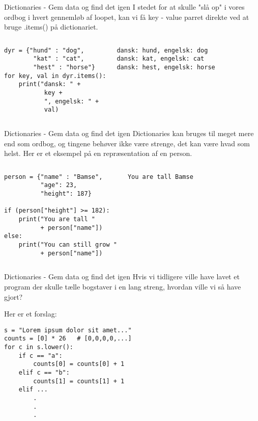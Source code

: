 \documentclass[main.tex]{subfiles}
\begin{document}
\begin{frame}[fragile]{Dictionaries - Gem data og find det igen}
	I stedet for at skulle "slå op" i vores ordbog i hvert gennemløb af loopet, kan vi få key - value parret direkte ved at bruge .items() på dictionariet.
	\begin{columns}
		\begin{lstlisting}[style=python]
dyr = {"hund" : "dog", 
        "kat" : "cat", 
        "hest" : "horse"}
for key, val in dyr.items():
    print("dansk: " + 
           key + 
           ", engelsk: " + 
           val)
		\end{lstlisting}
		
		\pause
		\begin{lstlisting}[style=python]
dansk: hund, engelsk: dog
dansk: kat, engelsk: cat
dansk: hest, engelsk: horse
		\end{lstlisting}
	\end{columns}	
\end{frame}

\begin{frame}[fragile]{Dictionaries - Gem data og find det igen}
	Dictionaries kan bruges til meget mere end som ordbog, og tingene behøver ikke være strenge, det kan være hvad som helst. Her er et eksempel på en repræsentation af en person.
	\begin{columns}
		\column{0.5\textwidth}
		\begin{lstlisting}[style=python]
person = {"name" : "Bamse",
          "age": 23,
          "height": 187}

if (person["height"] >= 182):
	print("You are tall "
	      + person["name"])
else:
	print("You can still grow "
	      + person["name"])
		\end{lstlisting}
		
		\pause
		\column{0.3\textwidth}
		\begin{lstlisting}[style=python]
You are tall Bamse
		\end{lstlisting}
	\end{columns}	
\end{frame}

\begin{frame}[fragile]{Dictionaries - Gem data og find det igen}
	Hvis vi tidligere ville have lavet et program der skulle tælle bogstaver i en lang streng, hvordan ville vi så have gjort?
	\pause
	
	Her er et forslag:
	\begin{lstlisting}[style=python]
s = "Lorem ipsum dolor sit amet..."
counts = [0] * 26	# [0,0,0,0,...]
for c in s.lower():
    if c == "a":
        counts[0] = counts[0] + 1
    elif c == "b":
        counts[1] = counts[1] + 1
    elif ...
        .
        .
        .
	\end{lstlisting}
\end{frame}
\end{document}
